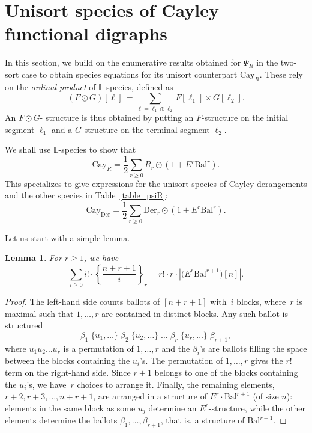 \documentclass[a4paper,11pt,UKenglish]{article}
\newcommand{\LL}{\mathbb{L}}
\newcommand{\Set}{E}
\newcommand{\Der}{\mathrm{Der}}
\newcommand{\Bal}{\mathrm{Bal}}
\newcommand{\Cay}{\mathrm{Cay}}
\newcommand{\sdiff}[3]{\genfrac{\{}{\}}{}{}{{#1}}{{#2}}_{{#3}}}
\newtheorem{lemma}[theorem]{Lemma}
\theoremstyle{definition}
\begin{document}
\section{Unisort species of Cayley functional digraphs}\label{section_unisort}

In this section, we build on the enumerative results obtained
for $\Psi_R$ in the two-sort case to obtain species
equations for its unisort counterpart $\Cay_R$.
These rely on the \emph{ordinal product} of $\LL$-species, defined as
\[
(F \odot G)[\ell] \,= \sum_{\ell=\ell_1 \oplus \ell_2} F[\ell_1] \times G[\ell_2].
\]
An $F\odot G$- structure is thus obtained by putting an $F$-structure
on the initial segment $\ell_1$ and a $G$-structure on the terminal
segment $\ell_2$.

We shall use $\LL$-species to show that
$$
\Cay_R
=\frac{1}{2}\sum_{r\ge 0} R_r\odot(1+\Set^r\Bal^r).
$$
This specializes to give expressions for the unisort species of
Cayley-derangements and the other species in Table~\ref{table_psiR}:
\begin{equation}\label{unisort_cayder}
\Cay_{\Der}
=\frac{1}{2}\sum_{r\ge 0} \Der_r\odot\left(1+\Set^r\Bal^r\right).
\end{equation}

Let us start with a simple lemma.

\begin{lemma}\label{lemma_EBal}
For $r\ge 1$, we have
\begin{equation*}
\sum_{i\ge 0}i!\cdot\sdiff{n+r+1}{i}{r}
=r!\cdot r\cdot |\bigl(\Set^r\Bal^{r+1}\bigr)[n]|.
\end{equation*}
\end{lemma}
\begin{proof}
The left-hand side counts ballots of $[n+r+1]$ with~$i$ blocks,
where~$r$ is maximal such that $1,\dots,r$ are contained in
distinct blocks. Any such ballot is structured
$$
\beta_1\;\{u_1,\ldots \}\;
\beta_2\;\{u_2,\ldots \}\;
\dots\;
\beta_r\;\{u_r,\ldots\}\;
\beta_{r+1},
$$
where $u_1u_2\dots u_r$ is a permutation of $1,\ldots,r$
and the $\beta_i$'s are ballots filling the space between the blocks
containing the $u_i$'s.
The permutation of $1,\ldots,r$ gives the $r!$ term
on the right-hand side. Since $r+1$ belongs to one of the blocks containing the $u_i$'s, we have~$r$ choices to arrange it.
Finally, the remaining elements, $r+2,r+3,\ldots,n+r+1$, are
arranged in a structure of $\Set^r\cdot\Bal^{r+1}$ (of size $n$):
elements in the same block as some $u_j$ determine an
$\Set^r$-structure, while the other elements determine the ballots
$\beta_1,\dots,\beta_{r+1}$, that is, a structure of $\Bal^{r+1}$.
\end{proof}
\end{document}
